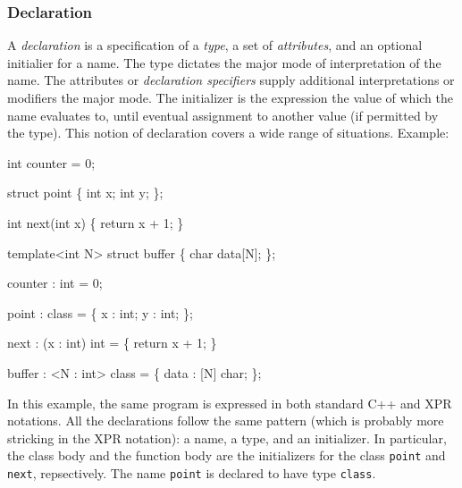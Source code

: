 \documentclass[letter,11pt]{article}
\begin{document}
\subsubsection{Declaration}
\label{sec:intro:general-notion:declaration}
A \emph{declaration} is a specification of a \emph{type}, a set of
\emph{attributes}, and an optional initialier for a name.  The type dictates
the major mode of interpretation of the name.  The attributes or
\emph{declaration specifiers} supply additional interpretations or modifiers
the major mode.  The initializer is the expression the value of which the
name evaluates to, until eventual assignment to another value (if permitted by
the type).  This notion of declaration covers a wide range of situations.
Example:

\begin{minipage}[t]{12cm}
  \begin{minipage}[t]{5cm}
    \begin{Program}
  int counter = 0;

  struct point \{
    int x;
    int y;
  \};

  int next(int x) \{
    return x + 1;
  \}

  template<int N>
  struct buffer \{
     char data[N];
  \};
    
    \end{Program}
  \end{minipage}\hfil \vrule \hfil
  \begin{minipage}[t]{5cm}
    \begin{Program}
  counter : int = 0;

  point : class = \{
    x : int;
    y : int;
  \};

  next : (x : int) int = \{
    return x + 1;
  \}

  buffer : <N : int> class = \{
    data : [N] char;
  \};
    \end{Program}
  \end{minipage}
\end{minipage}

In this example, the same program is expressed in both standard C++ and XPR
notations.  All the declarations follow the same pattern (which is probably
more stricking in the XPR notation): a name, a type, and an initializer.  In
particular, the class body and the function body are the initializers for the
class \texttt{point} and \texttt{next}, repsectively.  The name \texttt{point}
is declared to have type \texttt{class}.
 
\end{document}
